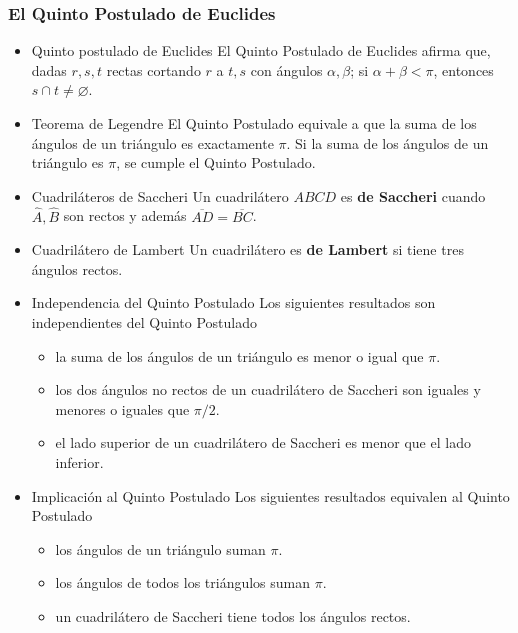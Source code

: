 \documentclass[11pt]{article}
\begin{document}
\subsubsection*{El Quinto Postulado de Euclides}
\label{sec-5-2-1}
\begin{itemize}
\item Quinto postulado de Euclides
\label{sec-5-2-1-1}
El Quinto Postulado de Euclides afirma que, dadas $r,s,t$ rectas
cortando $r$ a $t,s$ con ángulos $\alpha,\beta$; si $\alpha+\beta < \pi$, entonces $s \cap t \neq \varnothing$.

\item Teorema de Legendre
\label{sec-5-2-1-2}
El Quinto Postulado equivale a que la suma de los ángulos de un
triángulo es exactamente $\pi$. Si la suma de los ángulos de un triángulo
es $\pi$, se cumple el Quinto Postulado.

\item Cuadriláteros de Saccheri
\label{sec-5-2-1-3}
Un cuadrilátero $ABCD$ es \textbf{de Saccheri} cuando $\widehat{A},\widehat{B}$ son rectos y 
además $\overline{AD}=\overline{BC}$.

\item Cuadrilátero de Lambert
\label{sec-5-2-1-4}
Un cuadrilátero es \textbf{de Lambert} si tiene tres ángulos rectos.

\item Independencia del Quinto Postulado
\label{sec-5-2-1-5}
Los siguientes resultados son independientes del Quinto Postulado

\begin{itemize}
\item la suma de los ángulos de un triángulo es menor o igual que $\pi$.
\item los dos ángulos no rectos de un cuadrilátero de Saccheri son
iguales y menores o iguales que $\pi/2$.
\item el lado superior de un cuadrilátero de Saccheri es menor que 
el lado inferior.
\end{itemize}

\item Implicación al Quinto Postulado
\label{sec-5-2-1-6}
Los siguientes resultados equivalen al Quinto Postulado

\begin{itemize}
\item los ángulos de un triángulo suman $\pi$.
\item los ángulos de todos los triángulos suman $\pi$.
\item un cuadrilátero de Saccheri tiene todos los ángulos rectos.
\end{itemize}
\end{itemize}
\end{document}

